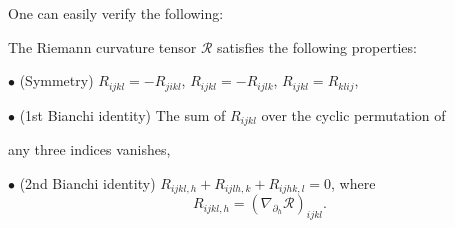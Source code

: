 One can easily verify the following:

\begin{lemma}
\label{claim:curvature-symmetries-bianchi}
\label{Bianchi}
\leanok
The Riemann curvature tensor ${\mathcal R}$ satisfies the following
properties:

$\bullet$ (Symmetry) $R_{ijkl}=-R_{jikl}$, $R_{ijkl}=-R_{ijlk}$,
$R_{ijkl}=R_{klij}$,

$\bullet$ (1st Bianchi identity) The sum of
$R_{ijkl}$ over the cyclic permutation of

\quad any three indices vanishes,

$\bullet$ (2nd Bianchi identity)
$R_{ijkl,h}+R_{ijlh,k}+R_{ijhk,l}=0$, where
$$R_{ijkl,h}=(\nabla_{\partial_h}{\mathcal R})_{ijkl}.$$
\end{lemma}

